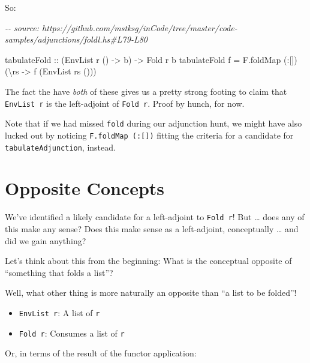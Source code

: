 \documentclass[]{article}
\newenvironment{Shaded}{}{}
\newcommand{\CommentTok}[1]{\textcolor[rgb]{0.38,0.63,0.69}{\textit{#1}}}
\newcommand{\DataTypeTok}[1]{\textcolor[rgb]{0.56,0.13,0.00}{#1}}
\newcommand{\NormalTok}[1]{#1}
\newcommand{\OperatorTok}[1]{\textcolor[rgb]{0.40,0.40,0.40}{#1}}
\newcommand{\OtherTok}[1]{\textcolor[rgb]{0.00,0.44,0.13}{#1}}
\begin{document}
So:

\begin{Shaded}
\begin{Highlighting}[]
\CommentTok{{-}{-} source: https://github.com/mstksg/inCode/tree/master/code{-}samples/adjunctions/foldl.hs\#L79{-}L80}

\OtherTok{tabulateFold ::}\NormalTok{ (}\DataTypeTok{EnvList}\NormalTok{ r () }\OtherTok{{-}\textgreater{}}\NormalTok{ b) }\OtherTok{{-}\textgreater{}} \DataTypeTok{Fold}\NormalTok{ r b}
\NormalTok{tabulateFold f }\OtherTok{=}\NormalTok{ F.foldMap (}\OperatorTok{:}\NormalTok{[]) (\textbackslash{}rs }\OtherTok{{-}\textgreater{}}\NormalTok{ f (}\DataTypeTok{EnvList}\NormalTok{ rs ()))}
\end{Highlighting}
\end{Shaded}

The fact the have \emph{both} of these gives us a pretty strong footing to claim
that \texttt{EnvList\ r} is the left-adjoint of \texttt{Fold\ r}. Proof by
hunch, for now.

Note that if we had missed \texttt{fold} during our adjunction hunt, we might
have also lucked out by noticing \texttt{F.foldMap\ (:{[}{]})} fitting the
criteria for a candidate for \texttt{tabulateAdjunction}, instead.

\section{Opposite Concepts}\label{opposite-concepts}

We've identified a likely candidate for a left-adjoint to \texttt{Fold\ r}! But
\ldots{} does any of this make any sense? Does this make sense as a
left-adjoint, conceptually \ldots{} and did we gain anything?

Let's think about this from the beginning: What is the conceptual opposite of
``something that folds a list''?

Well, what other thing is more naturally an opposite than ``a list to be
folded''!

\begin{itemize}
\tightlist
\item
  \texttt{EnvList\ r}: A list of \texttt{r}
\item
  \texttt{Fold\ r}: Consumes a list of \texttt{r}
\end{itemize}

Or, in terms of the result of the functor application:
\end{document}
